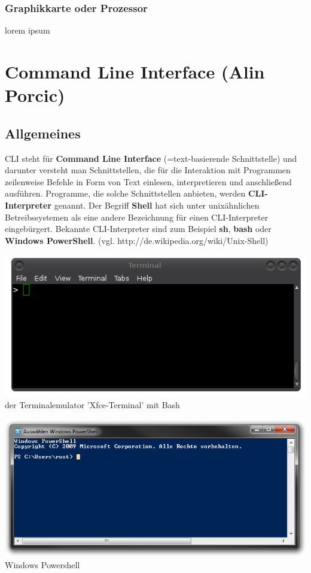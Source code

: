 \documentclass[12pt,a4paper]{report}
\begin{document}
\begin{onehalfspace}
\subsubsection{Graphikkarte oder Prozessor}
lorem ipsum
\newpage
\section{Command Line Interface (Alin Porcic)}
\subsection{Allgemeines}

CLI steht für \textbf{Command Line Interface} (=text-basierende Schnittstelle) und darunter versteht man Schnittstellen, die für die Interaktion mit Programmen zeilenweise Befehle in Form von Text einlesen, interpretieren und anschließend ausführen. Programme, die solche Schnittstellen anbieten, werden \textbf{CLI-Interpreter} genannt. Der Begriff \textbf{Shell} hat sich unter unixähnlichen Betreibssystemen als eine andere Bezeichnung für einen CLI-Interpreter eingebürgert. Bekannte CLI-Interpreter sind zum Beispiel \textbf{sh}, \textbf{bash} oder \textbf{Windows PowerShell}. (vgl.  http://de.wikipedia.org/wiki/Unix-Shell)

\begin{center}
\includegraphics[scale=0.5]{img/cli_pic.png}\\
der Terminalemulator 'Xfce-Terminal' mit Bash
\end{center}

\begin{center}
\includegraphics[scale=0.52]{img/powershell.png}\\
Windows Powershell
\end{center}


\end{onehalfspace}
\end{document}
